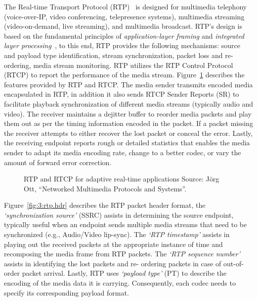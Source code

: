 
The Real-time Transport Protocol (RTP)~\cite{rfc3550} is designed for
multimedia telephony (voice-over-IP, video conferencing, telepresence
systems), multimedia streaming (video-on-demand, live streaming), and
multimedia broadcast. RTP's design is based on the fundamental principles of
\textit {application-layer framing} and \textit{integrated layer
processing}~\cite{clark:alf}, to this end, RTP provides the following
mechanisms: source and payload type identification, stream synchronization,
packet loss and re-ordering, media stream monitoring. RTP utilizes the RTP
Control Protocol (RTCP) to report the performance of the media stream.
Figure~\ref{fig:3:rtp:model} describes the features provided by RTP and RTCP.
The media sender transmits encoded media encapsulated in RTP, in addition it
also sends RTCP Sender Reports (SR) to facilitate playback synchronization of
different media streams (typically audio and video). The receiver maintains a
dejitter buffer to reorder media packets and play them out as per the timing
information encoded in the packet. If a packet missing the receiver attempts
to either recover the lost packet or conceal the error. Lastly, the receiving
endpoint reports rough or detailed statistics that enables the media sender to
adapt its media encoding rate, change to a better codec, or vary the amount of
forward error correction.

\begin{figure}[!h]
\caption{RTP and RTCP for adaptive real-time applications {\scriptsize Source:
J\"org Ott, ``Networked Multimedia Protocols and Systems''}.}
\label{fig:3:rtp:model}
\end{figure}

Figure~\ref{fig:3:rtp.hdr} describes the RTP packet header format, the
\textit{`synchronization source'} (SSRC) assists in determining the source
endpoint, typically useful when an endpoint sends multiple media streams that
need to be synchronized (e.g., Audio/Video lip-sync). The \textit{`RTP
timestamp'} assists in playing out the received packets at the appropriate
instance of time and recomposing the media frame from RTP packets. The
\textit{`RTP sequence number'} assists in identifying the lost packets and re-
ordering packets in case of out-of-order packet arrival. Lastly, RTP uses
\textit{`payload type'} (PT) to describe the encoding of the media data it is
carrying. Consequently, each codec needs to specify its corresponding payload
format.

